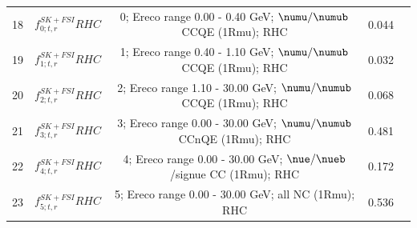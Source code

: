 {\begin{table}
\begin{tabular}{| c | c | c | c | c |}
18     &  $f_{0; t, r}^{SK+FSI}RHC$               &   0; Ereco range 0.00 - 0.40 GeV; \(\numu/\numub\) CCQE (1Rmu); RHC         & 0.044      \\ 
19     &  $f_{1; t, r}^{SK+FSI}RHC$               &   1; Ereco range 0.40 - 1.10 GeV; \(\numu/\numub\) CCQE (1Rmu); RHC         & 0.032      \\ 
20     &  $f_{2; t, r}^{SK+FSI}RHC$               &   2; Ereco range 1.10 - 30.00 GeV; \(\numu/\numub\) CCQE (1Rmu); RHC        & 0.068      \\ 
21     &  $f_{3; t, r}^{SK+FSI}RHC$               &   3; Ereco range 0.00 - 30.00 GeV; \(\numu/\numub\) CCnQE (1Rmu); RHC       & 0.481      \\ 
22     &  $f_{4; t, r}^{SK+FSI}RHC$               &   4; Ereco range 0.00 - 30.00 GeV; \(\nue/\nueb\)/signue CC (1Rmu); RHC     & 0.172      \\ 
23     &  $f_{5; t, r}^{SK+FSI}RHC$               &   5; Ereco range 0.00 - 30.00 GeV; all NC (1Rmu); RHC                   & 0.536      \\ 


\end{tabular}
\end{table}}
